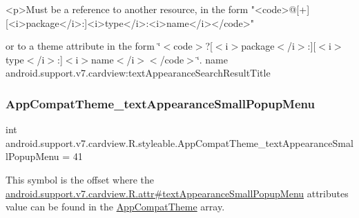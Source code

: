 \begin{DoxyVerb}      <p>Must be a reference to another resource, in the form "<code>@[+][<i>package</i>:]<i>type</i>:<i>name</i></code>"
\end{DoxyVerb}
 or to a theme attribute in the form \char`\"{}$<$code$>$?\mbox{[}$<$i$>$package$<$/i$>$\+:\mbox{]}\mbox{[}$<$i$>$type$<$/i$>$\+:\mbox{]}$<$i$>$name$<$/i$>$$<$/code$>$\char`\"{}.  name android.\+support.\+v7.\+cardview\+:text\+Appearance\+Search\+Result\+Title \mbox{\label{classandroid_1_1support_1_1v7_1_1cardview_1_1R_1_1styleable_a5c5300533d341ed70cf8866e7cea0fab}} 
\subsubsection{\texorpdfstring{App\+Compat\+Theme\+\_\+text\+Appearance\+Small\+Popup\+Menu}{AppCompatTheme\_textAppearanceSmallPopupMenu}}
{\footnotesize\ttfamily int android.\+support.\+v7.\+cardview.\+R.\+styleable.\+App\+Compat\+Theme\+\_\+text\+Appearance\+Small\+Popup\+Menu = 41\hspace{0.3cm}{\ttfamily [static]}}

This symbol is the offset where the \hyperlink{classandroid_1_1support_1_1v7_1_1cardview_1_1R_1_1attr_a33d0659633dc1776cf97b3cce1cc6e27}{android.\+support.\+v7.\+cardview.\+R.\+attr\#text\+Appearance\+Small\+Popup\+Menu} attribute\textquotesingle{}s value can be found in the \hyperlink{classandroid_1_1support_1_1v7_1_1cardview_1_1R_1_1styleable_a52e6f69f954ecc2622d72c0b4d298938}{App\+Compat\+Theme} array.

